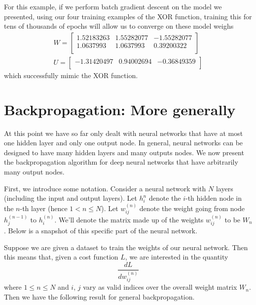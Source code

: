 \documentclass[12pt,letterpaper]{book}
\theoremstyle{definition}
\begin{document}
  For this example, if we perform batch gradient descent on the model we presented, using our 
  four training examples of the XOR function,
  training this for tens of thousands of epochs
  will allow us to converge on these model weighs 
  \begin{align}
    W = 
    \begin{bmatrix}
      1.52183263 & 1.55282077 & -1.55282077 \\
      1.0637993 & 1.0637993 & 0.39200322 \\
    \end{bmatrix}\\
    U = \begin{bmatrix}
      -1.31420497 & 0.94002694 & -0.36849359\\
    \end{bmatrix}
  \end{align}
  which successfully mimic the XOR function.

  
  \section{Backpropagation: More generally}
    At this point we have so far only dealt with neural networks that have at 
    most one hidden layer and only one output node. In general, neural networks can be designed 
    to have many hidden layers and many outputs nodes. We now present the backpropagation
    algorithm for deep neural networks that have arbitrarily many output nodes.

    First, we introduce some notation.
    Consider a neural network with $N$ layers (including the input and output layers).
    Let $h_i^{n}$ denote the $i$-th hidden node in the $n$-th layer (hence $1 < n \le N$).
    Let $w_{ij}^{(n)}$ denote the weight going from node 
    $h_j^{(n-1)}$ to $h_i^{(n)}$. We'll denote the 
    matrix made up of the weights $w_{ij}^{(n)}$ to be $W_n$.
    Below is a snapshot 
    of this specific part of the neural network.

    \begin{center}
    \end{center}
    Suppose we are given a dataset to train the weights of our neural network. 
    Then this means that, given a cost function $L$, we are interested in the quantity
    \[
      \frac{dL}{dw_{ij}^{(n)}} 
    \] 
    where $1 \le n \le N$ and $i$, $j$ vary as valid indices over the overall weight matrix 
    $W_n$. Then we have the following result for general backpropagation.
\end{document}
